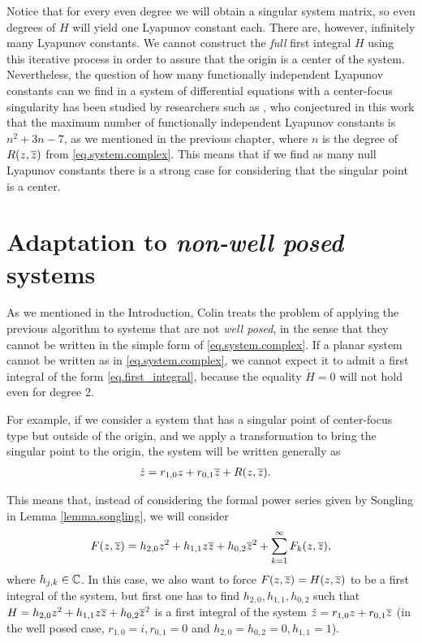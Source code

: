 Notice that for every even degree we will obtain a singular system matrix, so even degrees of $H$ will yield one Lyapunov constant each. There are, however, infinitely many Lyapunov constants. We cannot construct the \emph{full} first integral $H$ using this iterative process in order to assure that the origin is a center of the system. Nevertheless, the question of how many functionally independent Lyapunov constants can we find in a system of differential equations with a center-focus singularity has been studied by researchers such as \textcite{Gine2007}, who conjectured in this work that the maximum number of functionally independent Lyapunov constants is $n^2+3n-7$, as we mentioned in the previous chapter, where $n$ is the degree of $R(z,\overline{z})$ from \eqref{eq.system.complex}. This means that if we find as many null Lyapunov constants there is a strong case for considering that the singular point is a center.


\section{Adaptation to \emph{non-well posed} systems}

As we mentioned in the Introduction, Colin \textcite{Christopher2006} treats the problem of applying the previous algorithm to systems that are not \emph{well posed}, in the sense that they cannot be written in the simple form of \eqref{eq.system.complex}. If a planar system cannot be written as in \eqref{eq.system.complex}, we cannot expect it to admit a first integral of the form \eqref{eq.first_integral}, because the equality $\dot H=0$ will not hold even for degree 2.

For example, if we consider a system that has a singular point of center-focus type but outside of the origin, and we apply a transformation to bring the singular point to the origin, the system will be written generally as
\begin{align}
\dot z&= r_{1,0}z+r_{0,1}\overline{z}+R(z,\overline{z}).
\end{align}

This means that, instead of considering the formal power series given by Songling in Lemma \ref{lemma.songling}, we will consider
\begin{align}
F(z,\overline{z})=h_{2,0}z^2+h_{1,1}z\overline{z}+h_{0,2}\overline{z}^2+\sum_{k=1}^\infty F_k(z,\overline{z}),
\end{align}
where $h_{j,k}\in\mathbb{C}$. In this case, we also want to force $F(z,\overline{z})=H(z,\overline{z})$ to be a first integral of the system, but first one has to find $h_{2,0},h_{1,1},h_{0,2}$ such that $H=h_{2,0}z^2+h_{1,1}z\overline{z}+h_{0,2}\overline{z}^2$ is a first integral of the system $\dot z=r_{1,0}z+r_{0,1}\overline{z}$ (in the well posed case, $r_{1,0}=i,r_{0,1}=0$ and $h_{2,0}=h_{0,2}=0,h_{1,1}=1$).

